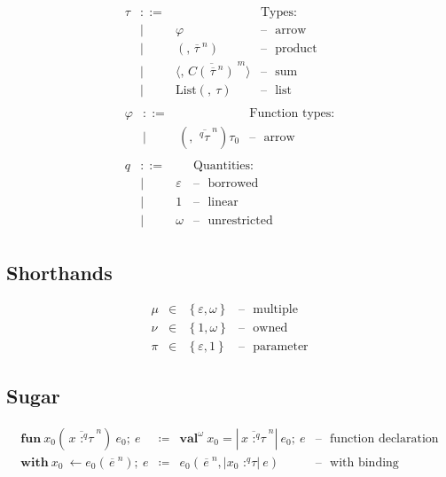 \[\begin{array}{r}
\begin{array}{llll}
\tau & ::= & & \text{Types}: \\
 & | & \varphi & \text{– }\text{ arrow} \\
 & | & {(,{\overline{\,\tau\:}}^{n})} & \text{– }\text{ product} \\
 & | & {\langle,{\overline{\,{C({\overline{\,\tau\:}}^{n})}\:}}^{m}\rangle} & \text{– }\text{ sum} \\
 & | & {\text{List}({,\ }\tau)} & \text{– }\text{ list}
\end{array} \\
\begin{array}{llll}
\varphi & ::= & & \text{Function types}: \\
 & | & {({,\ }{\overline{\,{{}^{q}\tau}\:}}^{n})\tau_{0}} & \text{– }\text{ arrow}
\end{array} \\
\begin{array}{llll}
q & ::= & & \text{Quantities}: \\
 & | & \varepsilon & \text{– }\text{ borrowed} \\
 & | & 1 & \text{– }\text{ linear} \\
 & | & \omega & \text{– }\text{ unrestricted}
\end{array}
\end{array}\]

\subsection{Shorthands}

\[\begin{array}{llll}
\mu & \in & \left\{ \varepsilon,\omega \right\} & \text{– }\text{ multiple} \\
\nu & \in & \left\{ 1,\omega \right\} & \text{– }\text{ owned} \\
\pi & \in & \left\{ \varepsilon,1 \right\} & \text{– }\text{ parameter}
\end{array}\]

\subsection{Sugar}

\[\begin{array}{llll}
{\mathsf{\mathbf{\text{fun}}}\ x_{0}({\overline{\,{x\text{ :}^{q}\tau}\:}}^{n})\ e_{0};\ e} & ≔ & {\mathsf{\mathbf{\text{val}}}^{\omega}\ x_{0} = {|{\overline{\,{x\text{ :}^{q}\tau}\:}}^{n}|\ e_{0}};\ e} & \text{– }\text{ function declaration} \\
{\mathsf{\mathbf{\text{with}}}\ x_{0}\  \leftarrow {e_{0}({\overline{\, e\:}}^{n})};\ e} & ≔ & {e_{0}({\overline{\, e\:}}^{n},{|{x_{0}\text{ :}^{q}\tau}|\ e})} & \text{– }\text{ with binding }
\end{array}\]

